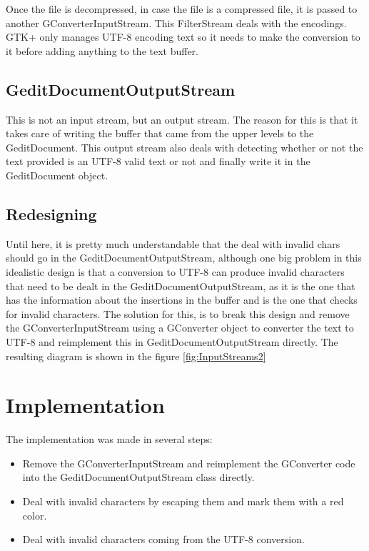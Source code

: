 Once the file is decompressed, in case the file is a compressed file, it is passed to another GConverterInputStream. This FilterStream deals with the encodings. GTK+ only manages UTF-8 encoding text so it needs to make the conversion to it before adding anything to the text buffer.

\subsection*{GeditDocumentOutputStream}

This is not an input stream, but an output stream. The reason for this is that it takes care of writing the buffer that came from the upper levels to the GeditDocument. This output stream also deals with detecting whether or not the text provided is an UTF-8 valid text or not and finally write it in the GeditDocument object.

\subsection{Redesigning}

Until here, it is pretty much understandable that the deal with invalid chars should go in the GeditDocumentOutputStream, although one big problem in this idealistic design is that a conversion to UTF-8 can produce invalid characters that need to be dealt in the GeditDocumentOutputStream, as it is the one that has the information about the insertions in the buffer and is the one that checks for invalid characters. The solution for this, is to break this design and remove the GConverterInputStream using a GConverter object to converter the text to UTF-8 and reimplement this in GeditDocumentOutputStream directly. The resulting diagram is shown in the figure \ref{fig:InputStreams2}


\newpage
\section{Implementation}

The implementation was made in several steps:
\begin{itemize}
  \item Remove the GConverterInputStream and reimplement the GConverter code into the GeditDocumentOutputStream class directly.
  \item Deal with invalid characters by escaping them and mark them with a red color.
  \item Deal with invalid characters coming from the UTF-8 conversion.
\end{itemize}

